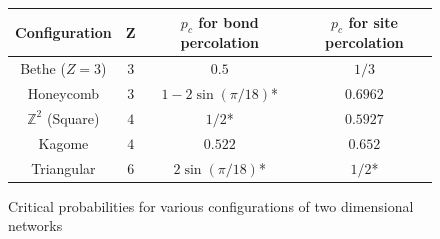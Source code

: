 \begin{figure}[h!]
\begin{center}
\begin{tabular}{| c | c | c | c |}
    \hline
    Configuration & Z & $p_c$ for bond percolation & $p_c$ for site percolation \\
    \hline
    Bethe ($Z=3$) & $3$ & $0.5$ & $1/3$ \\
    Honeycomb & $3$ & $1 - 2\sin(\pi/18)$* & $0.6962$ \\
    $\mathbb{Z}^2$ (Square) & $4$ & $1/2$* & $0.5927$ \\
    Kagome & $4$ & $0.522$ & $0.652$ \\
    Triangular & $6$ & $2\sin(\pi/18)$* & $1/2$* \\
    \hline
  \end{tabular}
\end{center}
\centering
\caption{Critical probabilities for various configurations of two dimensional networks\cite[p. 11]{Sahimi}}
\label{fig:critical probabilities in two dimensions}
\end{figure}

